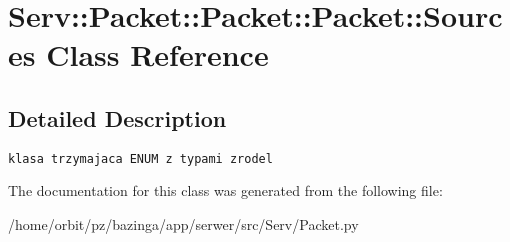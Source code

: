 \hypertarget{class_serv_1_1_packet_1_1_packet_1_1_sources}{
\section{Serv::Packet::Packet::Packet::Sources Class Reference}
\label{class_serv_1_1_packet_1_1_packet_1_1_sources}
}


\subsection{Detailed Description}


\footnotesize\begin{verbatim}
klasa trzymajaca ENUM z typami zrodel

\end{verbatim}
\normalsize
 

The documentation for this class was generated from the following file:\begin{CompactItemize}
\item 
/home/orbit/pz/bazinga/app/serwer/src/Serv/Packet.py\end{CompactItemize}
